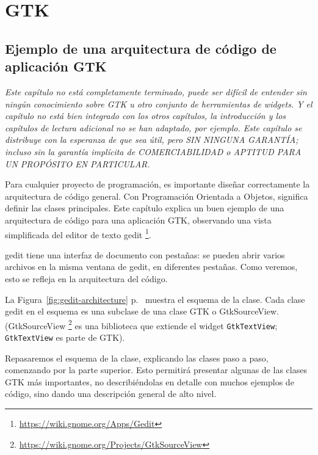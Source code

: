 \part{GTK}
\chapter{Ejemplo de una arquitectura de código de aplicación GTK}
\label{gtk-app-arch}

\emph{Este capítulo no está completamente terminado, puede ser difícil de entender sin ningún conocimiento sobre GTK u otro conjunto de herramientas de widgets. Y el capítulo no está bien integrado con los otros capítulos, la introducción y los capítulos de lectura adicional no se han adaptado, por ejemplo. Este capítulo se distribuye con la esperanza de que sea útil, pero SIN NINGUNA GARANTÍA; incluso sin la garantía implícita de COMERCIABILIDAD o APTITUD PARA UN PROPÓSITO EN PARTICULAR.}


Para cualquier proyecto de programación, es importante diseñar correctamente la arquitectura de código general. Con Programación Orientada a Objetos, significa definir las clases principales. Este capítulo explica un buen ejemplo de una arquitectura de código para una aplicación GTK, observando una vista simplificada del editor de texto gedit \footnote{\url{https://wiki.gnome.org/Apps/Gedit}}.

gedit tiene una interfaz de documento con pestañas: se pueden abrir varios archivos en la misma ventana de gedit, en diferentes pestañas. Como veremos, esto se refleja en la arquitectura del código.

La Figura~\ref{fig:gedit-architecture} p.~\pageref{fig:gedit-architecture} muestra el esquema de la clase. Cada clase gedit en el esquema es una subclase de una clase GTK o GtkSourceView. (GtkSourceView \footnote{\url{https://wiki.gnome.org/Projects/GtkSourceView}} es una biblioteca que extiende el widget \lstinline{GtkTextView}; \lstinline{GtkTextView} es parte de GTK).

Repasaremos el esquema de la clase, explicando las clases paso a paso, comenzando por la parte superior. Esto permitirá presentar algunas de las clases GTK más importantes, no describiéndolas en detalle con muchos ejemplos de código, sino dando una descripción general de alto nivel.

